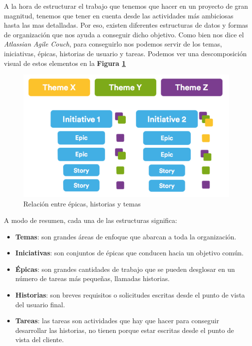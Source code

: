 A la hora de estructurar el trabajo que tenemos que hacer en un proyecto de gran magnitud, tenemos que tener en cuenta desde las actividades más ambiciosas hasta las mas detalladas. Por eso, existen diferentes estructuras de datos y formas de organización que nos ayuda a conseguir dicho objetivo. Como bien nos dice el \textit{Atlassian Agile Couch}, para conseguirlo nos podemos servir de los temas, iniciativas, épicas, historias de usuario y tareas. Podemos ver una descomposición visual de estos elementos en la \textbf{Figura \ref{fig:epicasHistorias}}

\begin{figure}[H]
    \centering
    \includegraphics[scale=0.8]{imagenes/diseno/epicasHistorias.png}
    \caption{Relación entre épicas, historias y temas}
    \label{fig:epicasHistorias}
\end{figure}


A modo de resumen, cada una de las estructuras significa:
\begin{itemize}
    \item \textbf{Temas}: son grandes áreas de enfoque que abarcan a toda la organización.
    \item \textbf{Iniciativas}: son conjuntos de épicas que conducen hacia un objetivo común.
    \item \textbf{Épicas}: son grandes cantidades de trabajo que se pueden desglosar en un número de tareas más pequeñas, llamadas historias. 
    \item \textbf{Historias}: son breves requisitos o solicitudes escritas desde el punto de vista del usuario final. 
    \item \textbf{Tareas}: las tareas son actividades que hay que hacer para conseguir desarrollar las historias, no tienen porque estar escritas desde el punto de vista del cliente.  
\end{itemize}

